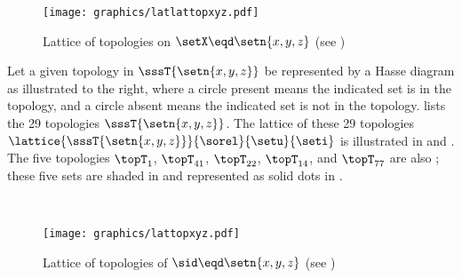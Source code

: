 \begin{figure}[th]
  \centering%
  \texttt{[image: graphics/latlattopxyz.pdf]}%
  \caption{
    Lattice of topologies on $\setX\eqd\setn{x,y,z}$ (see )
    \label{fig:set_latlat_top_xyz}
    }
\end{figure}
\begin{minipage}{\tw-45mm}
\begin{example}
\label{ex:set_lat_top_xyz}
\footnotemark
Let a given topology in $\sssT{\setn{x,y,z}}$ be represented by a Hasse diagram 
as illustrated to the right, where a circle present means the indicated set is in the topology,
and a circle absent means the indicated set is not in the topology.
 lists the 29 topologies $\sssT{\setn{x,y,z}}$.
The lattice of these 29 topologies $\lattice{\sssT{\setn{x,y,z}}}{\sorel}{\setu}{\seti}$
is illustrated in  and .
The five topologies
$\topT_{1}$, $\topT_{41}$, $\topT_{22}$, $\topT_{14}$, and $\topT_{77}$
are also ; 
these five sets are shaded in  and represented as solid dots in
.
\end{example}%
\end{minipage}%
\hfill%
%
\hfill\mbox{}\\


\begin{figure}[th]
  \centering%
  \texttt{[image: graphics/lattopxyz.pdf]}%
  \caption{
    Lattice of topologies of $\sid\eqd\setn{x,y,z}$ (see )
    \label{fig:set_lat_top_xyz}
    }
\end{figure}


